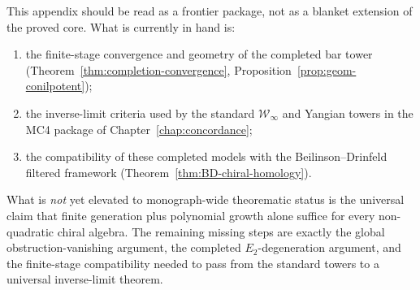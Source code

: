 \begin{remark}\label{rem:nilpotent-main}
This appendix should be read as a frontier package, not as a blanket
extension of the proved core.  What is currently in hand is:
\begin{enumerate}
\item the finite-stage convergence and geometry of the completed bar
      tower
      \textup{(}Theorem~\ref{thm:completion-convergence},
      Proposition~\ref{prop:geom-conilpotent}\textup{)};
\item the inverse-limit criteria used by the standard
      $\mathcal{W}_\infty$ and Yangian towers in the MC4 package of
      Chapter~\ref{chap:concordance};
\item the compatibility of these completed models with the
      Beilinson--Drinfeld filtered framework
      \textup{(}Theorem~\ref{thm:BD-chiral-homology}\textup{)}.
\end{enumerate}
What is \emph{not} yet elevated to monograph-wide theorematic status is
the universal claim that finite generation plus polynomial growth alone
suffice for every non-quadratic chiral algebra.  The remaining missing
steps are exactly the global obstruction-vanishing argument, the
completed $E_2$-degeneration argument, and the finite-stage
compatibility needed to pass from the standard towers to a universal
inverse-limit theorem.
\end{remark}
